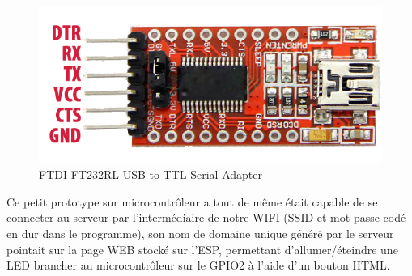 \begin{figure}[htp]
  \centering
  \includegraphics[width=12cm]{images/ftdi}
  \caption{FTDI FT232RL USB to TTL Serial Adapter}
  \label{fig:une-autre-image}
\end{figure}

Ce petit prototype sur microcontrôleur a tout de même était capable de se connecter au serveur par l'intermédiaire de notre WIFI (SSID et mot passe codé en dur dans le programme), son nom de domaine unique généré par le serveur pointait sur la page WEB stocké sur l'ESP, permettant d'allumer/éteindre une LED brancher au microcontrôleur sur le GPIO2 à l'aide d'un bouton HTML.

